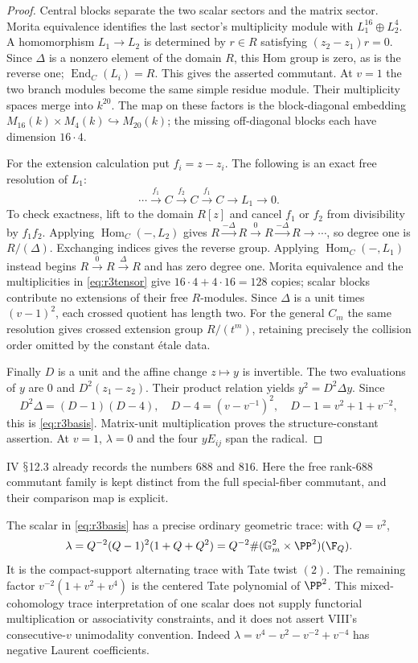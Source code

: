 \documentclass[11pt,a4paper]{article}
\newcommand{\Hom}{\operatorname{Hom}}\newcommand{\Spec}{\operatorname{Spec}}\newcommand{\Tr}{\operatorname{Tr}}\newcommand{\rank}{\operatorname{rank}}\newcommand{\Sym}{\operatorname{Sym}}\newcommand{\Res}{\operatorname{Res}}\newcommand{\IC}{\operatorname{IC}}\newcommand{\Gr}{\operatorname{Gr}}\newcommand{\Rep}{\operatorname{Rep}}\newcommand{\Frob}{\operatorname{Frob}}\newcommand{\End}{\operatorname{End}}
\renewcommand{\S}{\ensuremath{\mathsection}}
\theoremstyle{named}\newtheorem{finding}{Finding}[section]
\theoremstyle{definition}\newtheorem{definition}[finding]{Definition}
\theoremstyle{remark}\newtheorem{remark}[finding]{Remark}
\begin{document}
\begin{proof}
Central blocks separate the two scalar sectors and the matrix sector.
Morita equivalence identifies the last sector's multiplicity module
with $L_1^{16}\oplus L_2^4$. A homomorphism $L_1\to L_2$ is determined
by $r\in R$ satisfying $(z_2-z_1)r=0$. Since $\Delta$ is a nonzero
element of the domain $R$, this Hom group is zero, as is the reverse
one; $\End_C(L_i)=R$. This gives the asserted commutant. At $v=1$ the
two branch modules become the same simple residue module. Their
multiplicity spaces merge into $k^{20}$. The map on these factors is
the block-diagonal embedding $M_{16}(k)\times M_4(k)\hookrightarrow
M_{20}(k)$; the missing off-diagonal blocks each have dimension $16\cdot4$.

For the extension calculation put $f_i=z-z_i$. The following is an
exact free resolution of $L_1$:
\[
 \cdots\xrightarrow{f_1}C\xrightarrow{f_2}C
             \xrightarrow{f_1}C\longrightarrow L_1\longrightarrow0.
\]
To check exactness, lift to the domain $R[z]$ and cancel $f_1$ or $f_2$
from divisibility by $f_1f_2$. Applying $\Hom_C(-,L_2)$ gives
$R\xrightarrow{-\Delta}R\xrightarrow0R\xrightarrow{-\Delta}R\to\cdots$,
so degree one is $R/(\Delta)$. Exchanging indices gives the reverse
group. Applying $\Hom_C(-,L_1)$ instead begins
$R\xrightarrow0R\xrightarrow\Delta R$ and has zero degree one.
Morita equivalence and the multiplicities in \eqref{eq:r3tensor} give
$16\cdot4+4\cdot16=128$ copies; scalar blocks contribute no extensions
of their free $R$-modules. Since $\Delta$ is a unit times $(v-1)^2$,
each crossed quotient has length two. For the general $C_m$ the same
resolution gives crossed extension group $R/(t^m)$, retaining precisely
the collision order omitted by the constant \'etale data.

Finally $D$ is a unit and the affine change $z\mapsto y$ is invertible.
The two evaluations of $y$ are $0$ and $D^2(z_1-z_2)$. Their product
relation yields $y^2=D^2\Delta y$. Since
\[
 D^2\Delta=(D-1)(D-4),\quad
 D-4=(v-v^{-1})^2,\quad D-1=v^2+1+v^{-2},
\]
this is \eqref{eq:r3basis}. Matrix-unit multiplication proves the
structure-constant assertion. At $v=1$, $\lambda=0$ and the four
$yE_{ij}$ span the radical.
\end{proof}
IV \S12.3 already records the numbers $688$ and $816$. Here the free
rank-$688$ commutant family is kept distinct from the full
special-fiber commutant, and their comparison map is explicit.

The scalar in \eqref{eq:r3basis} has a precise ordinary geometric trace:
with $Q=v^2$,
\[
 \lambda=Q^{-2}(Q-1)^2(1+Q+Q^2)
       =Q^{-2}\#(\mathbb G_m^2\times\PP^2)(\F_Q).
\]
It is the compact-support alternating trace with Tate twist $(2)$.
The remaining factor $v^{-2}(1+v^2+v^4)$ is the centered Tate polynomial
of $\PP^2$. This mixed-cohomology trace interpretation of one scalar
does not supply functorial multiplication or associativity constraints,
and it does not assert VIII's consecutive-$v$ unimodality convention.
Indeed $\lambda=v^4-v^2-v^{-2}+v^{-4}$ has negative Laurent coefficients.
\end{document}
